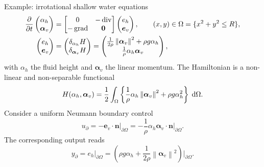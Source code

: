 \documentclass[aspectratio=169]{ISAE-Beamer}
\DeclareMathOperator*{\grad}{grad}
\renewcommand{\div}{\operatorname{div}}
\newcommand*{\norm}[1]{\ensuremath{\left\|#1\right\|}}
\newcommand{\energy}[1]{\frac{1}{2} \int_{\Omega} \left\{ #1 \right\} \d\Omega}
\begin{document}
\begin{frame}{Example: irrotational shallow water equations}
\begin{equation*}
\begin{aligned}
\diffp{}{t}
\begin{pmatrix}
\alpha_h \\
\bm{\alpha}_v \\
\end{pmatrix} &= 
\begin{bmatrix}
0 & -\div \\
-\grad & \bm{0}
\end{bmatrix}
\begin{pmatrix}
e_h\\
\bm{e}_v\\
\end{pmatrix}, \qquad (x,y) \in \Omega = \{x^2 + y^2 \le R \}, \\
\begin{pmatrix}
e_h\\
\bm{e}_v\\
\end{pmatrix} &= \begin{pmatrix}
\delta_{\alpha_h} H\\
\delta_{\bm{\alpha}_v} H\\
\end{pmatrix} = 
\begin{pmatrix}
\frac{1}{2 \rho} \norm{\bm{\alpha}_v}^2 + \rho g \alpha_h \\
\frac{1}{\rho} \alpha_h \bm{\alpha}_v
\end{pmatrix}, 
\end{aligned}
\end{equation*}
with $\alpha_h$ the fluid height and $\bm{\alpha}_v$ the linear momentum. The Hamiltonian is a non-linear and non-separable functional
\begin{equation*}
H(\alpha_h, \bm{\alpha}_v) = \energy{\frac{1}{\rho} \alpha_h \norm{\bm{\alpha}_v}^2 + \rho g \alpha_h^2}.
\end{equation*}
Consider a uniform Neumann boundary control 
\begin{equation*}
{u}_\partial = - \bm{e}_v \cdot \bm{n}\vert_{\partial\Omega} = - \frac{1}{\rho}\alpha_h \bm{\alpha}_v \cdot\bm{n}\vert_{\partial\Omega}. 
\end{equation*}
The corresponding output reads
\begin{equation*}
{y}_\partial = {e}_h\vert_{\partial\Omega} = (\rho g \alpha_h + \frac{1}{2\rho} \norm{\bm{\alpha}_v}^2)\vert_{\partial\Omega}.
\end{equation*}


\end{frame}
\end{document}
